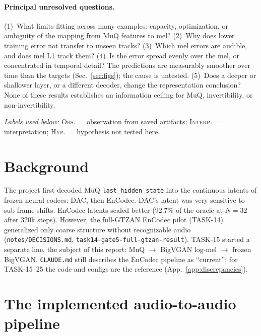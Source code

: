 \documentclass[10pt,letterpaper]{article}
\newcommand{\src}[1]{\nolinkurl{#1}}
\newcommand{\obs}{\textsc{Obs.}}
\newcommand{\interp}{\textsc{Interp.}}
\newcommand{\hyp}{\textsc{Hyp.}}
\begin{document}
\paragraph{Principal unresolved questions.}
(1)~What limits fitting across many examples: capacity, optimization, or ambiguity of the mapping from MuQ features to mel?
(2)~Why does lower training error not transfer to unseen tracks?
(3)~Which mel errors are audible, and does mel L1 track them?
(4)~Is the error spread evenly over the mel, or concentrated in temporal detail? The predictions are measurably smoother over time than the targets (Sec.~\ref{sec:figs}); the cause is untested.
(5)~Does a deeper or shallower layer, or a different decoder, change the representation conclusion?
None of these results establishes an information ceiling for MuQ, invertibility, or non-invertibility.

\noindent\textit{Labels used below:} \obs\ = observation from saved artifacts; \interp\ = interpretation; \hyp\ = hypothesis not tested here.
\endgroup

\clearpage
\section{Background}
\label{sec:background}
The project first decoded MuQ \texttt{last\_hidden\_state} into the continuous latents of frozen neural codecs: DAC, then EnCodec. DAC's latent was very sensitive to sub-frame shifts. EnCodec latents scaled better (92.7\% of the oracle at $N{=}32$ after 320k steps). However, the full-GTZAN EnCodec pilot (TASK-14) generalized only coarse structure without recognizable audio (\src{notes/DECISIONS.md}, \texttt{task14-gate5-full-gtzan-result}). TASK-15 started a separate line, the subject of this report: MuQ $\to$ BigVGAN log-mel $\to$ frozen BigVGAN. \src{CLAUDE.md} still describes the EnCodec pipeline as ``current''; for TASK-15--25 the code and configs are the reference (App.~\ref{app:discrepancies}).

\section{The implemented audio-to-audio pipeline}
\label{sec:pipeline}
\end{document}
